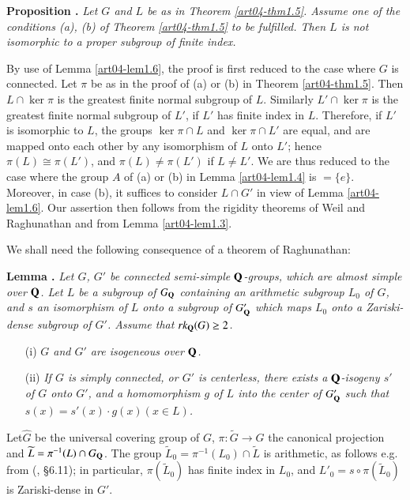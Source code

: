 \medskip
\noindent
{\bf Proposition .\label{art04-prop1.7}}
{\em Let $G$ and $L$ be as in Theorem \ref{art04-thm1.5}. Assume one of the conditions (a), (b) of Theorem \ref{art04-thm1.5} to be fulfilled. Then $L$ is not isomorphic to a proper subgroup of finite index.}
\smallskip

By use of Lemma \ref{art04-lem1.6}, the proof is first reduced to the case where $G$ is connected. Let $\pi$ be as in the proof of (a) or (b) in Theorem \ref{art04-thm1.5}. Then $L\cap \ker \pi$ is the greatest finite normal subgroup of $L$. Similarly $L'\cap \ker \pi$ is the greatest finite normal subgroup of $L'$, if $L'$ has finite index in $L$. Therefore, if $L'$ is isomorphic to $L$, the groups $\ker \pi \cap L$ and $\ker \pi \cap L'$ are equal, and are mapped onto each other by any isomorphism of $L$ onto $L'$; hence $\pi(L)\cong \pi(L')$, and $\pi(L)\neq \pi(L')$ if $L\neq L'$. We are thus reduced to the case where the group $A$ of (a) or (b) in Lemma \ref{art04-lem1.4} is $=\{e\}$. Moreover, in case (b), it suffices to consider $L\cap G'$ in view of Lemma \ref{art04-lem1.6}. Our assertion then follows from the rigidity theorems of Weil and Raghunathan and from Lemma \ref{art04-lem1.3}.

We shall need the following consequence of a theorem of Raghunathan:

\medskip
\noindent
{\bf Lemma .\label{art04-lem1.8}}
{\em Let $G$, $G'$ be connected semi-simple $\mathbf{Q}$-groups, which are almost simple over $\mathbf{Q}$. Let $L$ be a subgroup of $G_{\mathbf{Q}}$ containing an arithmetic subgroup $L_{0}$ of $G$, and $s$ an isomorphism of $L$ onto a subgroup of $G'_{\mathbf{Q}}$ which maps $L_{0}$ onto a Zariski-dense subgroup of $G'$. Assume that $rk_{\mathbf{Q}}(G)\geq 2$.}
\begin{itemize}
\item[{\rm(i)}] {\em $G$ and $G'$ are isogeneous over $\mathbf{Q}$.}

\item[{\rm(ii)}] {\em If $G$ is simply connected, or $G'$ is centerless, there exists a $\mathbf{Q}$-isogeny $s'$ of $G$ onto $G'$, and a homomorphism $g$ of $L$ into the center of $G'_{\mathbf{Q}}$ such that $s(x)=s'(x)\cdot g(x)(x\in L)$.}
\end{itemize}

Let\pageoriginale $\widehat{G}$ be the universal covering group of $G$, $\pi:\widetilde{G}\to G$ the canonical projection and $\widetilde{L}=\pi^{-1}(L)\cap G_{\mathbf{Q}}$. The group $\widetilde{L}_{0}=\pi^{-1}(L_{0})\cap \widetilde{L}$ is arithmetic, as follows e.g. from (\cite{art04-key7}, \S6.11); in particular, $\pi(\widetilde{L}_{0})$ has finite index in $L_{0}$, and $L'_{0}=s\circ \pi(\widetilde{L}_{0})$ is Zariski-dense in $G'$.

